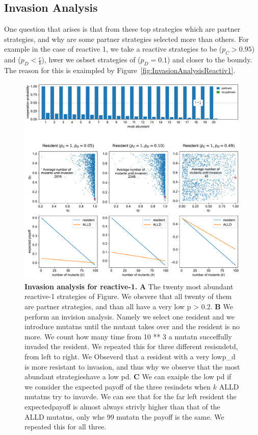 \documentclass[11pt]{article}
\theoremstyle{plainCl1}
\theoremstyle{plainCl2}
\begin{document}
\subsection{Invasion Analysis}

One question that arises is that from these top strategies which are partner
strategies, and why are some partner strategies selected more than others. For example
in the case of reactive 1, we take a reactive strategies to be ($p_{C} > 0.95$) and
($p_{D} < \frac{c}{b}$), hwer we osbset strategies of ($p_{D} = 0.1$) and closer
to the boundy. The reason for this is exaimpled by Figure~\ref{fig:InvasionAnalysisReactiv1}.


\begin{figure}[tbhp]
  \centering
  \includegraphics[width=\textwidth]{../../figures/siFigInvasionR1.pdf}
  \caption{\textbf{Invasion analysis for reactive-1.}
  \textbf{A} The twenty most abundant reactive-1 strategies of Figure. We obsvere
  that all twenty of them are partner strategies, and than all have a very low p > 0.2.
  \textbf{B} We perform an invision analysis. Namely we select one resident and we
  introduce mutatns until the mutant takes over and the resident is no more. We count
  how many time from 10 ** 3 a mutatn succeffully invaded the resident. We repeated this
  for three different resisndetd, from left to right. We Obseverd that a resident
  with a very lowp_d is more resistant to invasion, and thus why we observe that
  the most abundant strategieshave a low pd.
  \textbf{C} We can exaiple the low pd if we consider the expected payoff of the three
  resindets when \(k\) ALLD mutatns try to invavde. We can see that for the far left resident
  the expectedpayoff is almost always strivly higher than that of the ALLD mutatns, only whe
  99 mutatn the payoff is the same. We repeated this for all three.
  \text
  }\label{fig:InvasionAnalysisReactive1}
\end{figure}
\end{document}
